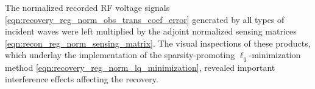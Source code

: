 The normalized recorded \ac{RF} voltage signals
\eqref{eqn:recovery_reg_norm_obs_trans_coef_error} generated by
all types of
incident waves were
left multiplied by
the adjoint normalized sensing matrices
\eqref{eqn:recon_reg_norm_sensing_matrix}.
The visual inspections of
these products, which underlay
the implementation of
the sparsity-promoting $\ell_{q}$-minimization method
\eqref{eqn:recovery_reg_norm_lq_minimization}, revealed
important interference effects affecting
the recovery.
